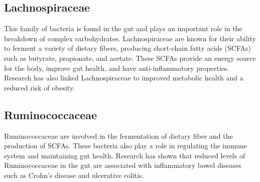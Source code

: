 \documentclass[
  twocolumn]{article}
\begin{document}

\newpage


\subsection{Lachnospiraceae}

\begin{small}
This family of bacteria is found in the gut and plays an important role in the 
breakdown of complex carbohydrates. Lachnospiraceae are known for their ability 
to ferment a variety of dietary fibers, producing short-chain fatty acids 
(SCFAs) such as butyrate, propionate, and acetate. These SCFAs provide an energy
source for the body, improve gut health, and have anti-inflammatory properties. 
Research has also linked Lachnospiraceae to improved metabolic health and a 
reduced risk of obesity.
\end{small}

\subsection{Ruminococcaceae}

\begin{small}
Ruminococcaceae are involved in the fermentation of dietary fiber and the 
production of SCFAs. These bacteria also play a role in regulating the immune 
system and maintaining gut health. Research has shown that reduced levels of 
Ruminococcaceae in the gut are associated with inflammatory bowel diseases such 
as Crohn's disease and ulcerative colitis.
\end{small}
\end{document}
